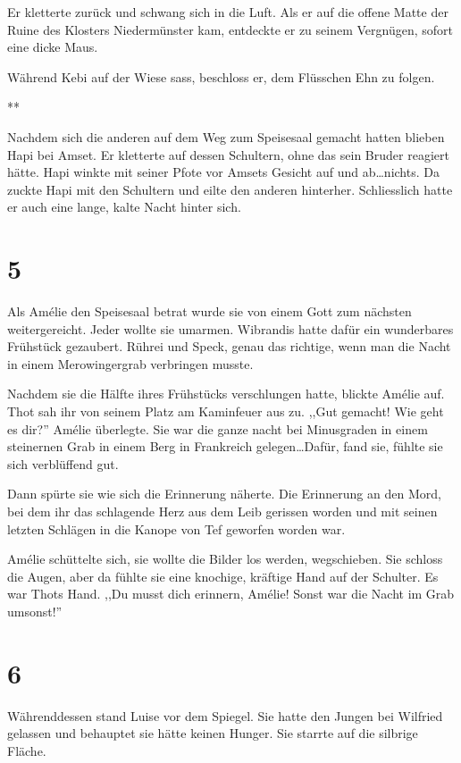 \documentclass[11pt,titlepage,a5paper]{book}
\newcommand{\sterne}{\par{\centering ***\par}}
\begin{document}
Er kletterte zurück und schwang sich in die Luft. Als er auf die offene Matte der Ruine des Klosters Niedermünster kam, entdeckte er zu seinem Vergnügen, sofort eine dicke Maus.

Während Kebi auf der Wiese sass, beschloss er, dem Flüsschen Ehn zu folgen.

\sterne

Nachdem sich die anderen auf dem Weg zum Speisesaal gemacht hatten blieben Hapi bei Amset. Er kletterte auf dessen Schultern, ohne das sein Bruder reagiert hätte. Hapi winkte mit seiner Pfote vor Amsets Gesicht auf und ab\dots nichts.
Da zuckte Hapi mit den Schultern und eilte den anderen hinterher. Schliesslich hatte er auch eine lange, kalte Nacht hinter sich.

\section*{5}

Als Amélie den Speisesaal betrat wurde sie von einem Gott zum nächsten weitergereicht. Jeder wollte sie umarmen. Wibrandis hatte dafür ein wunderbares Frühstück gezaubert. Rührei und Speck, genau das richtige, wenn man die Nacht in einem Merowingergrab verbringen musste.

Nachdem sie die Hälfte ihres Frühstücks verschlungen hatte, blickte Amélie auf. Thot sah ihr von seinem Platz am Kaminfeuer aus zu. ,,Gut gemacht! Wie geht es dir?'' Amélie überlegte. Sie war die ganze nacht bei Minusgraden in einem steinernen Grab in einem Berg in Frankreich gelegen\dots Dafür, fand sie, fühlte sie sich verblüffend gut.

Dann spürte sie wie sich die Erinnerung näherte. Die Erinnerung an den Mord, bei dem ihr das schlagende Herz aus dem Leib gerissen worden und mit seinen letzten Schlägen in die Kanope von Tef geworfen worden war.

Amélie schüttelte sich, sie wollte die Bilder los werden, wegschieben. Sie schloss die Augen, aber da fühlte sie eine knochige, kräftige Hand auf der Schulter. Es war Thots Hand. ,,Du musst dich erinnern, Amélie! Sonst war die Nacht im Grab umsonst!''

\section*{6}

Währenddessen stand Luise vor dem Spiegel. Sie hatte den Jungen bei Wilfried gelassen und behauptet sie hätte keinen Hunger. Sie starrte auf die silbrige Fläche.
\end{document}
